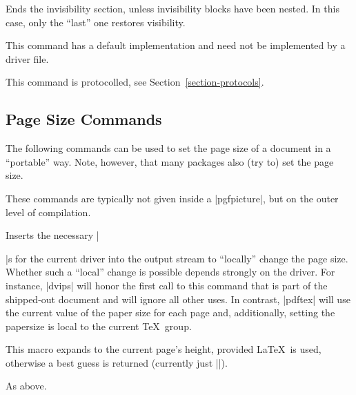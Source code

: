 \begin{command}{\pgfsys@endinvisible}
    Ends the invisibility section, unless invisibility blocks have been nested.
    In this case, only the ``last'' one restores visibility.

    This command has a default implementation and need not be implemented by a
    driver file.

    This command is protocolled, see Section~\ref{section-protocols}.
\end{command}


\subsection{Page Size Commands}

The following commands can be used to set the page size of a document in a
``portable'' way. Note, however, that many packages also (try to) set the page
size.

These commands are typically not given inside a |{pgfpicture}|, but on the
outer level of compilation.

\begin{command}{\pgfsys@papersize{}}
    Inserts the necessary |\special|s for the current driver into the output
    stream to ``locally'' change the page size. Whether such a ``local'' change
    is possible depends strongly on the driver. For instance, |dvips| will
    honor the first call to this command that is part of the shipped-out
    document and will ignore all other uses. In contrast, |pdftex| will use the
    current value of the paper size for each page and, additionally, setting
    the papersize is local to the current \TeX\ group.
\end{command}


\begin{command}{\pgfsys@thepageheight}
    This macro expands to the current page's height, provided \LaTeX\ is used,
    otherwise a best guess is returned (currently just |\the\vsize|).
\end{command}

\begin{command}{\pgfsys@thepagewidth}
    As above.
\end{command}


